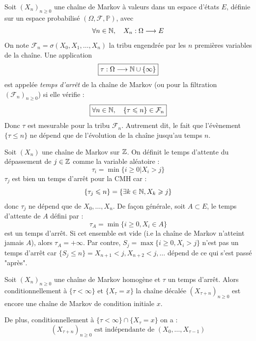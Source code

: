 \begin{definition}
    Soit $(X_n)_{n \geqslant 0}$ une chaîne de Markov à valeurs dans un espace d'états $E$, définie sur un espace probabilisé $(\Omega, \mathcal{F}, \mathbb{P})$, avec 
        \[ \forall n \in \mathbb{N}, \quad X_n : \Omega \longrightarrow E \]
    On note $\mathcal{F}_n = \sigma(X_0, X_1, \dots, X_n)$ la tribu engendrée par les $n$ premières variables de la chaîne.
    Une application
        \[ \boxed{\tau : \Omega \longrightarrow \mathbb{N} \cup \{\infty\}} \]
    est appelée \emph{temps d'arrêt} de la chaîne de Markov (ou pour la filtration $(\mathcal{F}_n)_{n \geqslant 0}$) si elle vérifie :
        \[ \boxed{ \forall n \in \mathbb{N}, \quad \{ \tau \leqslant n \} \in \mathcal{F}_n} \]
    Donc $ \tau$ est mesurable pour la tribu $ \mathcal{F}_n$.  
    Autrement dit, le fait que l'évènement $\{\tau \leqslant n\}$ ne dépend que de l’évolution de la chaîne jusqu’au temps $n$.
\end{definition}

\begin{example}
    Soit $(X_n)$ une chaîne de Markov sur $\mathbb{Z}$. On définit le temps d'attente du dépassement de $ j \in \mathbb{Z}$ comme 
    la variable aléatoire : 
        \[ \tau_i = \min \{i \geqslant 0 | X_i > j\} \] 
    $ \tau_j$ est bien un temps d'arrêt pour la CMH car : 
        $$ \{ \tau_j \leqslant n\} = \{ \exists k \in \mathbb{N}, X_k \geqslant j\} $$
    donc $ \tau_j$ ne dépend que de $X_0, \dots, X_n$. 
    De façon générale, soit $A \subset E$, le temps d'attente de $A$ défini par : 
        \[ \tau_A = \min \{i \geqslant 0, X_i \in A\} \]
    est un temps d'arrêt. Si cet ensemble est vide (i.e la chaîne de Markov n'atteint jamais $A$), alors $ \tau_A = + \infty$. 
    Par contre, $ S_j = \max \{i \geqslant 0, X_i > j\}$ n'est pas un temps d'arrêt car 
    $ \{S_j \leqslant n\} = {X_{n+1} < j, X_{n+2} < j, \dots}$ dépend de ce qui s'est passé "après". 
\end{example}

\begin{theorem}
    Soit $(X_n)_{n \geqslant 0}$ une chaîne de Markov homogène et $ \tau$ un temps d'arrêt. 
    Alors conditionnellement à $\{\tau < \infty\}$ et $\{X_\tau = x\}$ la chaîne décalée $(X_{\tau+n})_{n \geqslant 0}$ 
    est encore une chaîne de Markov de condition initiale $x$. 

    De plus, conditionnellement à $\{\tau < \infty\} \cap \{X_\tau = x\}$ on a : 
        \[ (X_{\tau+n})_{n \geqslant 0} \text{ est indépendante de } (X_0, \dots, X_{\tau-1}) \]  
\end{theorem}

